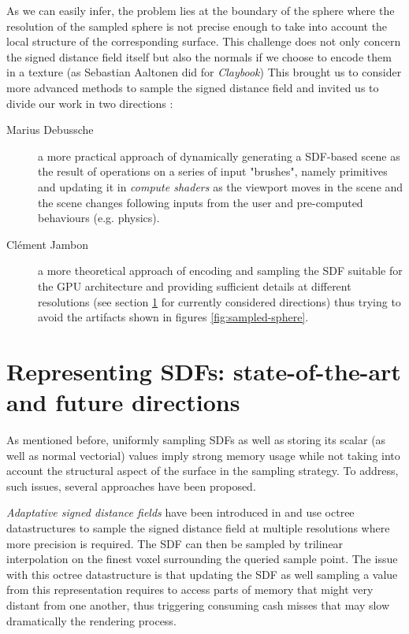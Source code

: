 \documentclass[10pt,a4paper,english, twocolumn]{article}
\begin{document}
As we can easily infer, the problem lies at the boundary of the sphere where the resolution of the sampled sphere is not precise enough to take into account the local structure of the corresponding surface. This challenge does not only concern the signed distance field itself but also the normals if we choose to encode them in a texture (as Sebastian Aaltonen did for \textit{Claybook}) This brought us to consider more advanced methods to sample the signed distance field and invited us to divide our work in two directions :
\begin{description}
    \item[Marius Debussche] $ $ \\
    a more practical approach of dynamically generating a SDF-based scene as the result of operations on a series of input "brushes", namely primitives and updating it in \textit{compute shaders} as the viewport moves in the scene and the scene changes following inputs from the user and pre-computed behaviours (e.g. physics).
    \item[Clément Jambon] $ $ \\
    a more theoretical approach of encoding and sampling the SDF suitable for the GPU architecture and providing sufficient details at different resolutions (see section \ref{sec:representing-sdf} for currently considered directions) thus trying to avoid the artifacts shown in figures \ref{fig:sampled-sphere}.
\end{description}

\section{Representing SDFs: state-of-the-art and future directions}
\label{sec:representing-sdf}

As mentioned before, uniformly sampling SDFs as well as storing its scalar (as well as normal vectorial) values imply strong memory usage while not taking into account the structural aspect of the surface in the sampling strategy. To address, such issues, several approaches have been proposed.

\textit{Adaptative signed distance fields} have been introduced in \cite{10.1145/344779.344899} and use octree datastructures to sample the signed distance field at multiple resolutions where more precision is required. The SDF can then be sampled by trilinear interpolation on the finest voxel surrounding the queried sample point. The issue with this octree datastructure is that updating the SDF as well sampling a value from this representation requires to access parts of memory that might very distant from one another, thus triggering consuming cash misses that may slow dramatically the rendering process.
\end{document}

